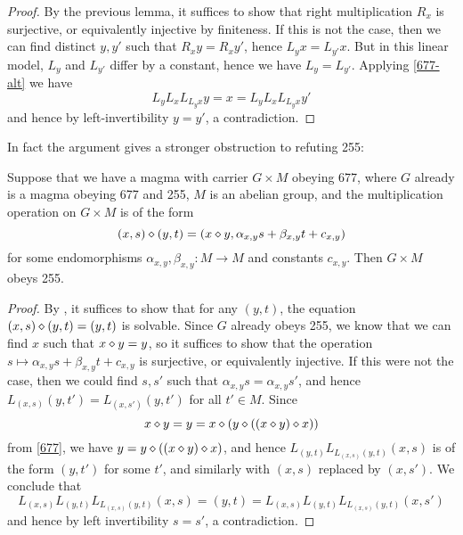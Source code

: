 \begin{proof}  By the previous lemma, it suffices to show that right multiplication $R_x$ is surjective, or equivalently injective by finiteness.  If this is not the case, then we can find distinct $y,y'$ such that $R_x y = R_x y'$, hence $L_y x = L_{y'} x$. But in this linear model, $L_y$ and $L_{y'}$ differ by a constant, hence we have $L_y = L_{y'}$.  Applying \eqref{677-alt} we have
$$  L_y L_x L_{L_y x} y = x =  L_y L_x L_{L_y x} y'$$
and hence by left-invertibility $y=y'$, a contradiction.
\end{proof}

In fact the argument gives a stronger obstruction to refuting 255:

\begin{lemma}\label{linear-2} Suppose that we have a magma with carrier $G \times M$ obeying 677, where $G$ already is a magma obeying 677 and 255, $M$ is an abelian group, and the multiplication operation on $G \times M$ is of the form
  $$ (x,s) \diamond (y,t) = (x \diamond y, \alpha_{x,y} s + \beta_{x,y} t + c_{x,y})$$
for some endomorphisms $\alpha_{x,y},\beta_{x,y}: M \to M$ and constants $c_{x,y}$.  Then $G \times M$ obeys 255.
\end{lemma}

\begin{proof}  By , it suffices to show that for any $(y,t)$, the equation $(x,s) \diamond (y,t) = (y,t)$ is solvable.  Since $G$ already obeys 255, we know that we can find $x$ such that $x \diamond y = y$, so it suffices to show that the operation $s \mapsto \alpha_{x,y} s + \beta_{x,y} t + c_{x,y}$ is surjective, or equivalently injective.  If this were not the case, then we could find $s,s'$ such that $\alpha_{x,y} s = \alpha_{x,y} s'$, and hence $L_{(x,s)} (y,t') = L_{(x,s')} (y,t')$ for all $t' \in M$.  Since
  $$ x \diamond y = y = x \diamond (y \diamond ((x \diamond y) \diamond x))$$
  from \eqref{677}, we have $y = y \diamond ((x \diamond y) \diamond x)$, and hence $L_{(y,t)} L_{L_{(x,s)} (y,t)} (x,s)$ is of the form $(y,t')$ for some $t'$, and similarly with $(x,s)$ replaced by $(x,s')$.  We conclude that
$$ L_{(x,s)} L_{(y,t)} L_{L_{(x,s)} (y,t)} (x,s) = (y,t) =
L_{(x,s)} L_{(y,t)} L_{L_{(x,s)} (y,t)} (x,s')$$
and hence by left invertibility $s=s'$, a contradiction.
\end{proof}

